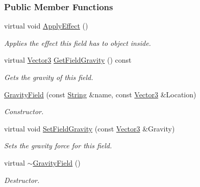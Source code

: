 \subsubsection*{Public Member Functions}
\begin{DoxyCompactItemize}
\item 
virtual void \hyperlink{classphys_1_1GravityField_a0322cb1635bbcb951493d9e17cc9acb1}{ApplyEffect} ()
\begin{DoxyCompactList}\small\item\em Applies the effect this field has to object inside. \item\end{DoxyCompactList}\item 
virtual \hyperlink{classphys_1_1Vector3}{Vector3} \hyperlink{classphys_1_1GravityField_a60473dfc835825b24fe67a86f4bc451e}{GetFieldGravity} () const 
\begin{DoxyCompactList}\small\item\em Gets the gravity of this field. \item\end{DoxyCompactList}\item 
\hyperlink{classphys_1_1GravityField_aece29280051e47dc6e5bd10fd3bf99c9}{GravityField} (const \hyperlink{namespacephys_aa03900411993de7fbfec4789bc1d392e}{String} \&name, const \hyperlink{classphys_1_1Vector3}{Vector3} \&Location)
\begin{DoxyCompactList}\small\item\em Constructor. \item\end{DoxyCompactList}\item 
virtual void \hyperlink{classphys_1_1GravityField_a4a784189c09ad4ce6806e0e92be2bc1c}{SetFieldGravity} (const \hyperlink{classphys_1_1Vector3}{Vector3} \&Gravity)
\begin{DoxyCompactList}\small\item\em Sets the gravity force for this field. \item\end{DoxyCompactList}\item 
virtual \hyperlink{classphys_1_1GravityField_ae41a656b247a2982da2e1ae666c605d0}{$\sim$GravityField} ()
\begin{DoxyCompactList}\small\item\em Destructor. \item\end{DoxyCompactList}\end{DoxyCompactItemize}
